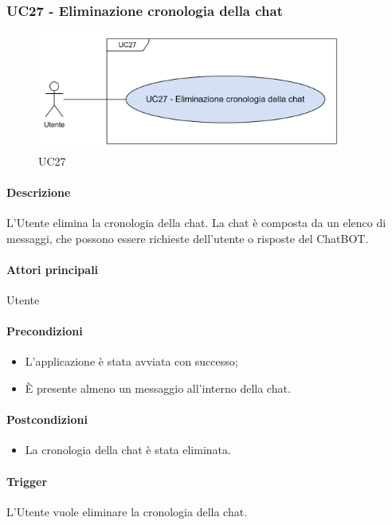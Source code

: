 \subsubsection{UC27 - Eliminazione cronologia della chat}\label{UC27}

\begin{figure}[H]
  \centering
  \includegraphics[width=0.90\textwidth]{assets/uc27.png}
  \caption{UC27}
\end{figure}

\paragraph*{Descrizione}
L'Utente elimina la cronologia della chat. La chat è composta da un elenco di messaggi, che possono essere richieste dell'utente o risposte del ChatBOT.

\paragraph*{Attori principali}
Utente

\paragraph*{Precondizioni}
\begin{itemize}
  \item L'applicazione è stata avviata con successo;
  \item È presente almeno un messaggio all'interno della chat.
\end{itemize}

\paragraph*{Postcondizioni}
\begin{itemize}
  \item La cronologia della chat è stata eliminata.
\end{itemize}

\paragraph*{Trigger}
L'Utente vuole eliminare la cronologia della chat.

